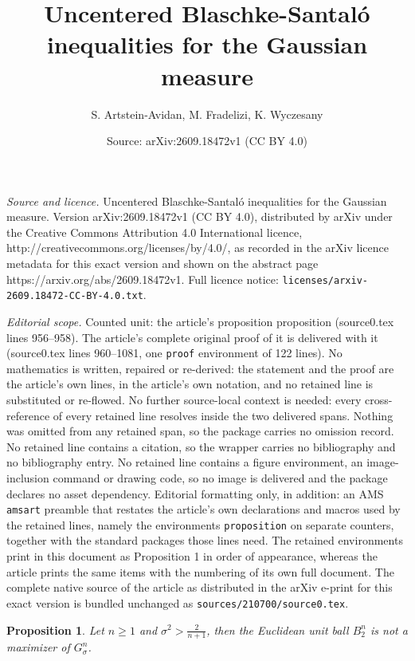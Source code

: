 \documentclass[10pt,a4paper]{amsart}
\title{Uncentered Blaschke-Santal\'o inequalities for the Gaussian measure}
\author{S. Artstein-Avidan, M. Fradelizi, K. Wyczesany}
\date{Source: arXiv:2609.18472v1 (CC BY 4.0)}
\newtheorem{proposition}{Proposition}
\begin{document}
\maketitle

\noindent\emph{Source and licence.} Uncentered Blaschke-Santal\'o inequalities for the Gaussian measure. Version arXiv:2609.18472v1 (CC BY 4.0), distributed by arXiv under the Creative Commons Attribution 4.0 International licence, http://creativecommons.org/licenses/by/4.0/, as recorded in the arXiv licence metadata for this exact version and shown on the abstract page https://arxiv.org/abs/2609.18472v1. Full licence notice: \texttt{licenses/arxiv-2609.18472-CC-BY-4.0.txt}.\par\smallskip

\noindent\textit{Editorial scope.} Counted unit: the article's proposition proposition (source0.tex lines 956--958). The article's complete original proof of it is delivered with it (source0.tex lines 960--1081, one \texttt{proof} environment of 122 lines). No mathematics is written, repaired or re-derived: the statement and the proof are the article's own lines, in the article's own notation, and no retained line is substituted or re-flowed.  No further source-local context is needed: every cross-reference of every retained line resolves inside the two delivered spans.  Nothing was omitted from any retained span, so the package carries no omission record.  No retained line contains a citation, so the wrapper carries no bibliography and no bibliography entry.  No retained line contains a figure environment, an image-inclusion command or drawing code, so no image is delivered and the package declares no asset dependency.  Editorial formatting only, in addition: an AMS \texttt{amsart} preamble that restates the article's own declarations and macros used by the retained lines, namely the environments \texttt{proposition} on separate counters, together with the standard packages those lines need.  The retained environments print in this document as Proposition 1 in order of appearance, whereas the article prints the same items with the numbering of its own full document.  The complete native source of the article as distributed in the arXiv e-print for this exact version is bundled unchanged as \texttt{sources/210700/source0.tex}.
\begin{proposition}
Let $n\ge 1$ and $\sigma^2>{\frac{2}{n+1}}$, then the Euclidean unit ball \(B_2^n\) is not a maximizer of $G^n_\sigma$. 
\end{proposition}
\end{document}
